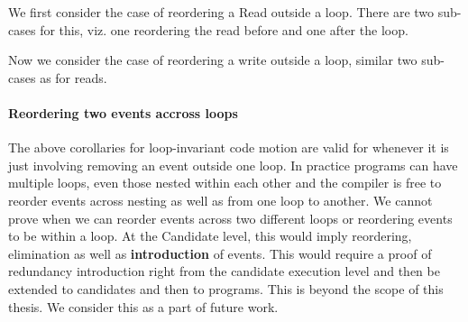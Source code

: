             We first consider the case of reordering a Read outside a loop. There are two sub-cases for this, viz. one reordering the read before and one after the loop. 
                        

            Now we consider the case of reordering a write outside a loop, similar two sub-cases as for reads.           
               

            \paragraph{Reordering two events accross loops} 
            
            The above corollaries for loop-invariant code motion are valid for whenever it is just involving removing an event outside one loop. 
            In practice programs can have multiple loops, even those nested within each other and the compiler is free to reorder events across nesting as well as from one loop to another.
            We cannot prove when we can reorder events across two different loops or reordering events to be within a loop.
            At the Candidate level, this would imply reordering, elimination as well as \textbf{introduction} of events. 
            This would require a proof of redundancy introduction right from the candidate execution level and then be extended to candidates and then to programs. 
            This is beyond the scope of this thesis. We consider this as a part of future work. 